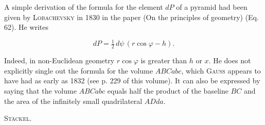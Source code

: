 A simple derivation of the formula for the element $dP$ of a pyramid had been given by
\textsc{Lobachevsky} in 1830 in the paper  (On
the principles of geometry) (Eq. 62). He writes

\[
dP = \tfrac{1}{2}\, d\psi\,(r\cos\varphi - h).
\]


Indeed, in non-Euclidean geometry $r\cos\varphi$ is greater than $h$
or $x$. He does not explicitly single out the formula for the volume $ABCabc$,
which \textsc{Gauss} appears to have had as early as 1832
(see p. 229 of this volume). It can also be expressed by saying
that the volume $ABCabc$ equals half the product of the baseline
$BC$ and the area of the infinitely small quadrilateral $ADda$. \begin{flushright}\textsc{Stäckel.}\end{flushright}



\par\endgroup
